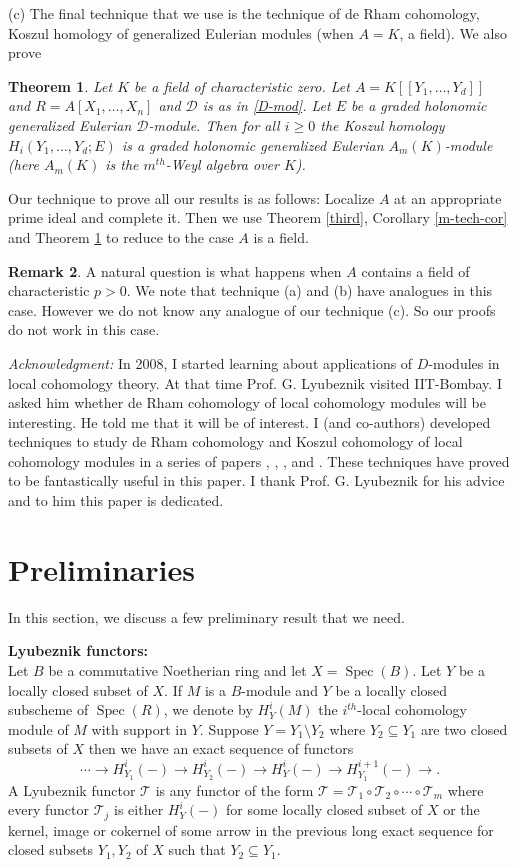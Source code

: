\documentclass{amsart}
\newcommand{\D}{\mathcal{D} }
\newcommand{\rt}{\rightarrow}
\newcommand{\FF}{\mathcal{T}}
\newcommand{\Spec}{\operatorname{Spec}}
\theoremstyle{plain}
\newtheorem{theorem}{Theorem}[section]
\theoremstyle{definition}
\newtheorem{remark}[theorem]{Remark}
\theoremstyle{remark}
\begin{document}
\s \label{deRham}(c) The final technique that we use is the technique of de Rham cohomology,
Koszul homology of generalized Eulerian modules (when $A = K$, a field).
We also prove
\begin{theorem}\label{kos-hom}
Let $K$ be a field of characteristic zero.
Let $A = K[[Y_1,\ldots, Y_d]]$ and $R = A[X_1,\ldots,X_n]$ and $\D$ is as in \ref{D-mod}. Let $E$ be a graded holonomic generalized Eulerian $\D$-module.
Then for all $i \geq 0$ the Koszul homology $H_i(Y_1,\ldots, Y_d; E)$ is a graded holonomic  generalized Eulerian $A_m(K)$-module (here $A_m(K)$ is the $m^{th}$-Weyl algebra over $K$).
\end{theorem}
 
 Our technique to prove all our results is as follows:
 Localize $A$ at an appropriate prime ideal and complete it. Then we use Theorem \ref{third}, Corollary \ref{m-tech-cor}
 and  Theorem \ref{kos-hom} to reduce to the case $A$ is a field. 
 
 \begin{remark}
  A natural question is what happens when $A$ contains a field of characteristic $p > 0$. We note that technique (a) and
  (b) have analogues in this case. However we do not know any analogue of our technique (c). So our proofs do not work in
  this case.
 \end{remark}

 
\textit{Acknowledgment:} In 2008, I started learning about applications of $D$-modules in local cohomology theory.
At that time Prof. G. Lyubeznik visited IIT-Bombay. I asked him whether de Rham cohomology 
of local cohomology modules will be interesting. He told me that it will be of interest. I  (and co-authors) developed 
techniques to study de Rham cohomology and Koszul cohomology  of local cohomology modules
in a series of papers \cite{P1}, \cite{P2}, \cite{PR1}, \cite{PR2} and \cite{PS}. These techniques have
proved to be fantastically useful in this paper. I thank
Prof. G. Lyubeznik for his advice and to him this paper is dedicated.
 
 
 \section{Preliminaries}
In this section, we discuss a few preliminary result that we need. 

 \s \textbf{Lyubeznik functors:} \\
 Let $B$ be a commutative Noetherian ring and let $X = \Spec(B)$. Let $Y$ be a locally closed subset of $X$.
 If $M$ is a $B$-module and  $Y$ be a locally closed subscheme of $\Spec(R)$, we denote by $H^i_Y(M)$ the
 $i^{th}$-local cohomology module of $M$ with support in $Y$.  Suppose 
 $Y = Y_1 \setminus Y_2$ where $Y_2 \subseteq Y_1$ are two closed subsets of $X$ then we have an exact sequence of functors
 \[
 \cdots \rt H^i_{Y_1}(-) \rt H^i_{Y_2}(-) \rt H^i_Y(-) \rt H^{i+1}_{Y_1}(-) \rt .
 \]
 A Lyubeznik functor $\FF$ is any functor of the form $\FF = \FF_1\circ \FF_2 \circ \cdots \circ \FF_m$ where every functor $\FF_j$  is either $H^i_Y(-)$ for some locally closed subset of $X$ or the kernel, image or
cokernel of some arrow in the previous long exact sequence for closed
subsets $Y_1,Y_2$ of $X$  such that $Y_2 \subseteq Y_1$.
\end{document}
